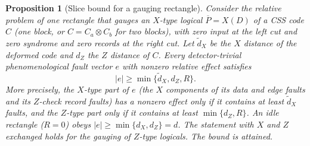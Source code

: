 \documentclass[aps,prx,reprint,superscriptaddress,nofootinbib,floatfix,longbibliography]{revtex4-2}
\newtheorem{proposition}[theorem]{Proposition}
\theoremstyle{definition}
\begin{document}
\begin{proposition}[Slice bound for a gauging rectangle]
\label{prop:slice-bound}
Consider the relative problem of one rectangle that gauges an $X$-type
logical $\overline P=X(D)$ of a CSS code $C$ (one block, or $C=C_a\otimes C_b$
for two blocks), with zero input at the left cut and zero syndrome and zero
records at the right cut.  Let $\widetilde d_X$ be the $X$ distance of the
deformed code and $d_Z$ the $Z$ distance of $C$.  Every detector-trivial
phenomenological fault vector $e$ with nonzero relative effect satisfies
\begin{equation}
 |e|\geq\min\{\widetilde d_X,d_Z,R\}.                                 \tag{A15s}
\end{equation}
More precisely, the $X$-type part of $e$ (the $X$ components of its data
and edge faults and its $Z$-check record faults) has a nonzero effect only if
it contains at least $\widetilde d_X$ faults, and the $Z$-type part only if it
contains at least $\min\{d_Z,R\}$.  An idle rectangle ($R=0$) obeys
$|e|\geq\min\{d_X,d_Z\}=d$.  The statement with $X$ and $Z$ exchanged holds
for the gauging of $Z$-type logicals.  The bound is attained.
\end{proposition}
\end{document}
